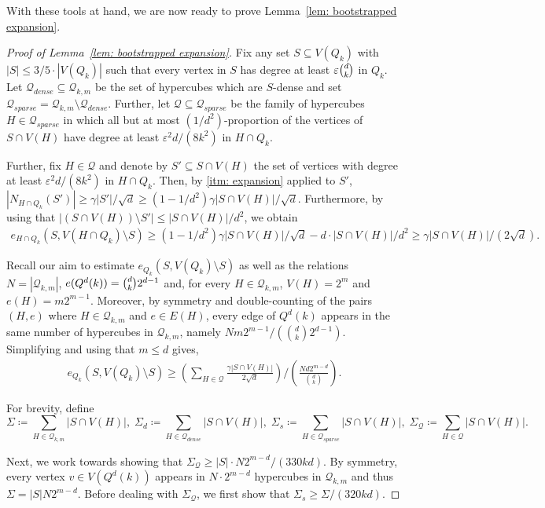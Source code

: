 \documentclass{article}
\theoremstyle{definition}
\newcommand{\eps}{\varepsilon}
\newcommand{\cQ}{\mathcal{Q}}
\begin{document}
With these tools at hand, we are now ready to prove Lemma~\ref{lem: bootstrapped expansion}. 
\begin{proof}[Proof of Lemma~\ref{lem: bootstrapped expansion}]
Fix any set $S\subseteq V(Q_k)$ with $|S|\leq 3/5\cdot |V(Q_k)|$ such that every vertex in $S$ has degree at least $\varepsilon \tbinom{d}{k}$ in $Q_k$. Let $\cQ_{dense}\subseteq\cQ_{k,m}$ be the set of hypercubes which are $S$-dense and set $\cQ_{sparse} = \cQ_{k,m}\setminus\cQ_{dense}$. 
Further, let $\cQ\subseteq \cQ_{sparse}$ be the family of hypercubes $H\in \cQ_{sparse}$ in which all but at most $(1/d^2)$-proportion of the vertices of $S\cap V(H)$ have degree at least $\eps^2d/(8k^2)$ in $H\cap Q_k$.

Further, fix $H\in \cQ$ and denote by $S'\subseteq S\cap V(H)$ the set of vertices with degree at least $\eps^2d/(8k^2)$ in $H\cap Q_k$. 
Then, by \ref{itm: expansion} applied to $S'$, $|N_{H\cap Q_k}(S')|\ge \gamma |S'|/\sqrt{d}\ge (1-1/d^2)\gamma |S\cap V(H)|/\sqrt d$. Furthermore, by using that $|(S\cap V(H))\setminus S'|\le |S\cap V(H)|/d^2$, we obtain
\begin{align*}
  e_{H\cap Q_k}(S,V(H\cap Q_k)\setminus S)
  \geq (1-1/d^2)\gamma|S\cap V(H)|/\sqrt d-d\cdot |S\cap V(H)|/d^2\geq \gamma|S\cap V(H)|/(2\sqrt d).  
\end{align*} 

Recall our aim to estimate $e_{Q_k}(S, V(Q_k)\setminus S)$ as well as the relations $N=|\cQ_{k,m}|$, $e(Q^d(k)) = \tbinom{d}{k} 2^{d-1}$ and, for every $H\in \cQ_{k,m}$, $V(H)=2^m$ and $e(H)=m2^{m-1}$.
Moreover, by symmetry and double-counting of the pairs $(H,e)$ where $H\in \cQ_{k,m}$ and $e\in E(H)$, every edge of $Q^d(k)$ appears in the same number of hypercubes in $\cQ_{k,m}$, namely $Nm2^{m-1}/(\binom{d}{k}2^{d-1})$. Simplifying and using that $m\le d$ gives,
\begin{align}\label{eq: edges leaving S}
    e_{Q_k}(S,V(Q_k)\setminus S)\geq \left(\sum_{H\in \cQ}\frac{\gamma|S\cap V(H)|}{2\sqrt d}\right)\bigg/\left(\frac{N d 2^{m-d}}{\binom{d}{k}}\right).
\end{align}

For brevity, define 
\[\Sigma\coloneqq\sum_{H\in \cQ_{k,m}}|S\cap V(H)|,\; \Sigma_d\coloneqq\sum_{H\in \cQ_{dense}}|S\cap V(H)|,\; \Sigma_s\coloneqq\sum_{H\in \cQ_{sparse}}|S\cap V(H)|,\; \Sigma_{\cQ}\coloneqq\sum_{H\in \cQ}|S\cap V(H)|.\]

Next, we work towards showing that $\Sigma_{\cQ}\ge |S|\cdot N2^{m-d}/(330kd)$. By symmetry, every vertex $v\in V(Q^d(k))$ appears in $N\cdot 2^{m-d}$ hypercubes in $\cQ_{k,m}$ and thus $\Sigma= |S|N2^{m-d}$. Before dealing with $\Sigma_\cQ$, we first show that $\Sigma_s\geq \Sigma/(320kd)$. 


\end{proof}
\end{document}
